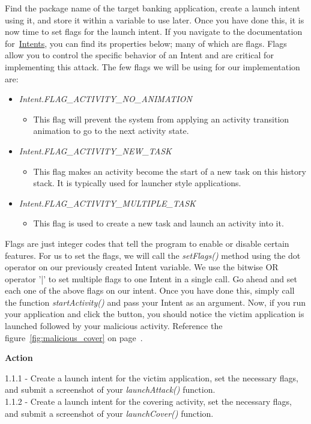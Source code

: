 \documentclass[letterpaper,12pt]{report}
\begin{document}
Find the package name of the target banking application, create a launch intent using it, and store it within a variable to use later. Once you have done this, it is now time to set flags for the launch intent. If you navigate to the documentation for~\href{https://developer.android.com/reference/android/content/Intent}{Intents}, you can find its properties below; many of which are flags. Flags allow you to control the specific behavior of an Intent and are critical for implementing this attack. The few flags we will be using for our implementation are: 
\bigskip
\begin{itemize}
  \item \emph{Intent.FLAG\_ACTIVITY\_NO\_ANIMATION}
  \begin{itemize}
    \item[] This flag will prevent the system from applying an activity transition animation to go to the next activity state.
  \end{itemize}
  \item \emph{Intent.FLAG\_ACTIVITY\_NEW\_TASK}
    \begin{itemize}
    \item[] This flag makes an activity become the start of a new task on this history stack. It is typically used for launcher style applications.
  \end{itemize}
  \item \emph{Intent.FLAG\_ACTIVITY\_MULTIPLE\_TASK}
    \begin{itemize}
    \item[] This flag is used to create a new task and launch an activity into it.
  \end{itemize}
\end{itemize}
\bigskip

Flags are just integer codes that tell the program to enable or disable certain features. For us to set the flags, we will call the \emph{setFlags()} method using the dot operator on our previously created Intent variable. We use the bitwise OR operator '|' to set multiple flags to one Intent in a single call. Go ahead and set each one of the  above flags on our intent. Once you have done this, simply call the function \emph{startActivity()} and pass your Intent as an argument. Now, if you run your application and click the button, you should notice the victim application is launched followed by your malicious activity. Reference the figure~\ref{fig:malicious_cover} on page~\pageref{fig:malicious_cover}.

\bigskip
\begin{mdframed}[backgroundcolor=blue!10,style=code,nobreak=true,align=center,userdefinedwidth=14cm]
\textbf{Action}
\bigskip

1.1.1 - Create a launch intent for the victim application, set the necessary flags, and submit a screenshot of your \emph{launchAttack()} function.\\
1.1.2 - Create a launch intent for the covering activity, set the necessary flags, and submit a screenshot of your \emph{launchCover()} function.\\\end{mdframed}
\end{document}
